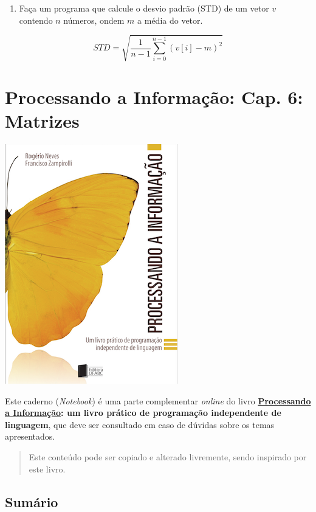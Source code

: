 \documentclass[12pt,a4paper]{article}
\providecommand{\tightlist}{%
      \setlength{\itemsep}{0pt}\setlength{\parskip}{0pt}}
\begin{document}
\begin{enumerate}
\def\labelenumi{\arabic{enumi}.}
\setcounter{enumi}{34}
\tightlist
\item
  Faça um programa que calcule o desvio padrão (STD) de um vetor \(v\)
  contendo \(n\) números, ondem \(m\) a média do vetor.
\end{enumerate}

\[ STD = \sqrt{\frac{1}{n-1} \sum_{i=0}^{n-1}(v[i]-m)^2} \]

    \hypertarget{processando-a-informauxe7uxe3o-cap.-6-matrizes}{%
\section{Processando a Informação: Cap. 6:
Matrizes}\label{processando-a-informauxe7uxe3o-cap.-6-matrizes}}

    \includegraphics{"figs/Capa_Processando_Informacao.jpg"}

Este caderno (\emph{Notebook}) é uma parte complementar \emph{online} do
livro
\textbf{\href{https://editora.ufabc.edu.br/matematica-e-ciencias-da-computacao/58-processando-a-informacao}{Processando
a Informação}: um livro prático de programação independente de
linguagem}, que deve ser consultado em caso de dúvidas sobre os temas
apresentados.

\begin{quote}
Este conteúdo pode ser copiado e alterado livremente, sendo inspirado
por este livro.
\end{quote}

    \hypertarget{sumuxe1rio}{%
\subsection{Sumário}\label{sumuxe1rio}}
\end{document}
